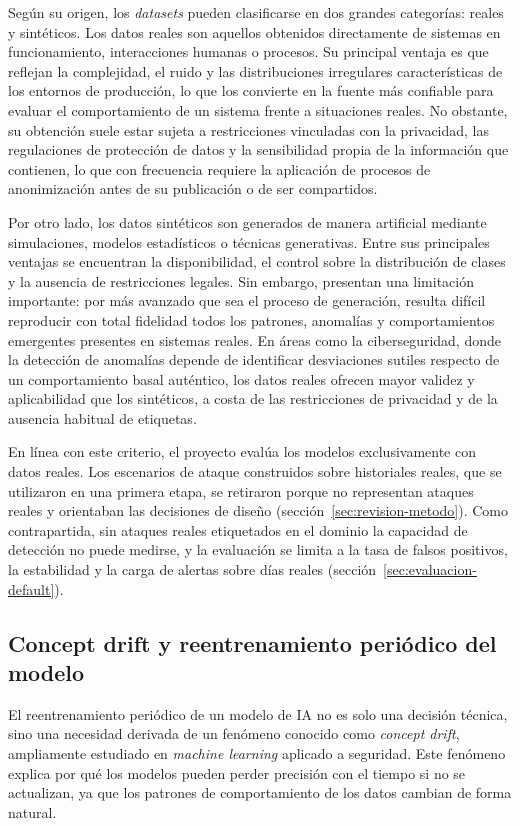 Según su origen, los \emph{datasets} pueden clasificarse en dos grandes categorías: reales y sintéticos. Los datos reales son aquellos obtenidos directamente de sistemas en funcionamiento, interacciones humanas o procesos. Su principal ventaja es que reflejan la complejidad, el ruido y las distribuciones irregulares características de los entornos de producción, lo que los convierte en la fuente más confiable para evaluar el comportamiento de un sistema frente a situaciones reales. No obstante, su obtención suele estar sujeta a restricciones vinculadas con la privacidad, las regulaciones de protección de datos y la sensibilidad propia de la información que contienen, lo que con frecuencia requiere la aplicación de procesos de anonimización antes de su publicación o de ser compartidos. 

Por otro lado, los datos sintéticos son generados de manera artificial mediante simulaciones, modelos estadísticos o técnicas generativas. Entre sus principales ventajas se encuentran la disponibilidad, el control sobre la distribución de clases y la ausencia de restricciones legales. Sin embargo, presentan una limitación importante: por más avanzado que sea el proceso de generación, resulta difícil reproducir con total fidelidad todos los patrones, anomalías y comportamientos emergentes presentes en sistemas reales. En áreas como la ciberseguridad, donde la detección de anomalías depende de identificar desviaciones sutiles respecto de un comportamiento basal auténtico, los datos reales ofrecen mayor validez y aplicabilidad que los sintéticos, a costa de las restricciones de privacidad y de la ausencia habitual de etiquetas.

En línea con este criterio, el proyecto evalúa los modelos exclusivamente con datos reales. Los escenarios de ataque construidos sobre historiales reales, que se utilizaron en una primera etapa, se retiraron porque no representan ataques reales y orientaban las decisiones de diseño (sección~\ref{sec:revision-metodo}). Como contrapartida, sin ataques reales etiquetados en el dominio la capacidad de detección no puede medirse, y la evaluación se limita a la tasa de falsos positivos, la estabilidad y la carga de alertas sobre días reales (sección~\ref{sec:evaluacion-default}).

\subsection{Concept drift y reentrenamiento periódico del modelo}
El reentrenamiento periódico de un modelo de IA no es solo una decisión técnica, sino una necesidad derivada de un fenómeno conocido como \emph{concept drift}, ampliamente estudiado en \emph{machine learning} aplicado a seguridad. Este fenómeno explica por qué los modelos pueden perder precisión con el tiempo si no se actualizan, ya que los patrones de comportamiento de los datos cambian de forma natural.

